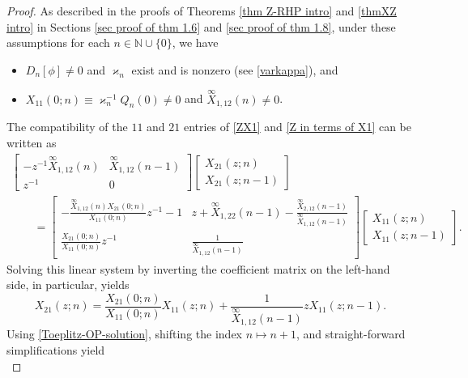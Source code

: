 \documentclass[10pt,a4paper]{amsart}
\numberwithin{equation}{section}
\newcommand{\N}{{\mathbb N}}
\newcommand{\di}{\displaystyle}
\begin{document}
		\begin{proof}
			As described in the proofs of Theorems \ref{thm Z-RHP intro} and \ref{thmXZ intro} in Sections \ref{sec proof of thm 1.6} and \ref{sec proof of thm 1.8}, under these assumptions for each $n \in \N \cup \{0\}$, we have
			\begin{itemize}\itemsep=0pt
				\item $D_n[\phi] \neq 0$ and $\varkappa_{n}$ exist and is nonzero (see \eqref{varkappa}), and
				\item$X_{11}(0;n) \equiv \varkappa^{-1}_n Q_n(0) \neq 0$ and $ \overset{\infty}{X}_{1,12}(n)\neq 0$.
			\end{itemize}
			The compatibility of the $11$ and $21$ entries of \eqref{ZX1} and \eqref{Z in terms of X1} can be written as
			\begin{gather}
						\begin{bmatrix}
						- z^{-1} \overset{\infty}{X}_{1,12}(n) & \overset{\infty}{X}_{1,12}(n-1) \\
						z^{-1} & 0
					\end{bmatrix} \begin{bmatrix}
						X_{21}(z;n) \\ X_{21}(z;n-1)
					\end{bmatrix}\nonumber \\
\qquad= 	\begin{bmatrix}
						- \di \tfrac{\overset{\infty}{X}_{1,12}(n)X_{21}(0;n)}{X_{11}(0;n)}z^{-1} - 1 & z + \overset{\infty}{X}_{1,22}(n-1) - \di \tfrac{\overset{\infty}{X}_{2,12}(n-1)}{\overset{\infty}{X}_{1,12}(n-1)} \\
						\di	\tfrac{X_{21}(0;n)}{X_{11}(0;n)} z^{-1} & \di
						\tfrac{1}{\overset{\infty}{X}_{1,12}(n-1)}
					\end{bmatrix} \begin{bmatrix}
						X_{11}(z;n) \\ X_{11}(z;n-1)
					\end{bmatrix}.\label{Z compatibility}
			\end{gather}
			Solving this linear system by inverting the coefficient matrix on the left-hand side, in particular, yields
			\begin{equation*}
				X_{21}(z;n) = \frac{X_{21}(0;n)}{X_{11}(0;n)} X_{11}(z;n) + 		\frac{1}{\overset{\infty}{X}_{1,12}(n-1)} z X_{11}(z;n-1).
			\end{equation*}
			Using \eqref{Toeplitz-OP-solution}, shifting the index $n \mapsto n+1$, and straight-forward simplifications yield
			\begin{equation}\label{zQ}

\end{equation}
\end{proof}
\end{document}
